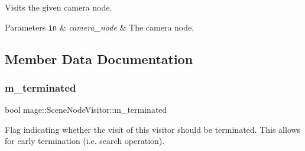 Visits the given camera node.


\begin{DoxyParams}[1]{Parameters}
\mbox{\tt in}  & {\em camera\+\_\+node} & The camera node. \\
\hline
\end{DoxyParams}


\subsection{Member Data Documentation}
\hypertarget{classmage_1_1_scene_node_visitor_a3f3b8db683cdb5b9c09c1426738ee73a}{}\label{classmage_1_1_scene_node_visitor_a3f3b8db683cdb5b9c09c1426738ee73a} 
\subsubsection{\texorpdfstring{m\+\_\+terminated}{m\_terminated}}
{\footnotesize\ttfamily bool mage\+::\+Scene\+Node\+Visitor\+::m\+\_\+terminated\hspace{0.3cm}{\ttfamily [private]}}

Flag indicating whether the visit of this visitor should be terminated. This allows for early termination (i.\+e. search operation). 